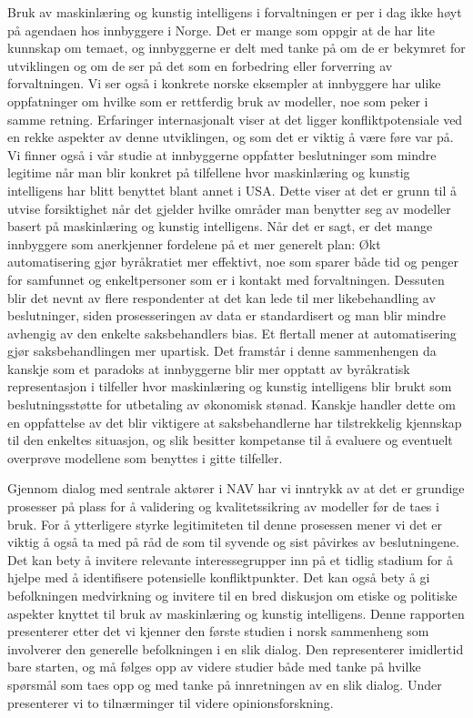 \documentclass[
]{book}
\begin{document}
Bruk av maskinlæring og kunstig intelligens i forvaltningen er per i dag ikke høyt på agendaen hos innbyggere i Norge.
Det er mange som oppgir at de har lite kunnskap om temaet, og innbyggerne er delt med tanke på om de er bekymret for utviklingen og om de ser på det som en forbedring eller forverring av forvaltningen.
Vi ser også i konkrete norske eksempler at innbyggere har ulike oppfatninger om hvilke som er rettferdig bruk av modeller, noe som peker i samme retning.
Erfaringer internasjonalt viser at det ligger konfliktpotensiale ved en rekke aspekter av denne utviklingen, og som det er viktig å være føre var på.
Vi finner også i vår studie at innbyggerne oppfatter beslutninger som mindre legitime når man blir konkret på tilfellene hvor maskinlæring og kunstig intelligens har blitt benyttet blant annet i USA.
Dette viser at det er grunn til å utvise forsiktighet når det gjelder hvilke områder man benytter seg av modeller basert på maskinlæring og kunstig intelligens.
Når det er sagt, er det mange innbyggere som anerkjenner fordelene på et mer generelt plan:
Økt automatisering gjør byråkratiet mer effektivt, noe som sparer både tid og penger for samfunnet og enkeltpersoner som er i kontakt med forvaltningen.
Dessuten blir det nevnt av flere respondenter at det kan lede til mer likebehandling av beslutninger, siden prosesseringen av data er standardisert og man blir mindre avhengig av den enkelte saksbehandlers bias.
Et flertall mener at automatisering gjør saksbehandlingen mer upartisk.
Det framstår i denne sammenhengen da kanskje som et paradoks at innbyggerne blir mer opptatt av byråkratisk representasjon i tilfeller hvor maskinlæring og kunstig intelligens blir brukt som beslutningsstøtte for utbetaling av økonomisk stønad.
Kanskje handler dette om en oppfattelse av det blir viktigere at saksbehandlerne har tilstrekkelig kjennskap til den enkeltes situasjon, og slik besitter kompetanse til å evaluere og eventuelt overprøve modellene som benyttes i gitte tilfeller.

Gjennom dialog med sentrale aktører i NAV har vi inntrykk av at det er grundige prosesser på plass for å validering og kvalitetssikring av modeller før de taes i bruk.
For å ytterligere styrke legitimiteten til denne prosessen mener vi det er viktig å også ta med på råd de som til syvende og sist påvirkes av beslutningene.
Det kan bety å invitere relevante interessegrupper inn på et tidlig stadium for å hjelpe med å identifisere potensielle konfliktpunkter.
Det kan også bety å gi befolkningen medvirkning og invitere til en bred diskusjon om etiske og politiske aspekter knyttet til bruk av maskinlæring og kunstig intelligens.
Denne rapporten presenterer etter det vi kjenner den første studien i norsk sammenheng som involverer den generelle befolkningen i en slik dialog.
Den representerer imidlertid bare starten, og må følges opp av videre studier både med tanke på hvilke spørsmål som taes opp og med tanke på innretningen av en slik dialog.
Under presenterer vi to tilnærminger til videre opinionsforskning.
\end{document}
